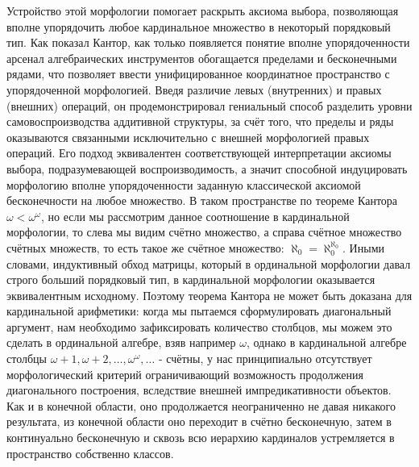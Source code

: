 \documentclass[12pt]{article}
\begin{document}
Устройство этой морфологии помогает раскрыть аксиома выбора, позволяющая вполне упорядочить любое кардинальное множество в некоторый порядковый тип. Как показал Кантор, как только появляется понятие вполне упорядоченности арсенал алгебраических инструментов обогащается пределами и бесконечными рядами, что позволяет ввести унифицированное координатное пространство с упорядоченной морфологией. Введя различие левых (внутренних) и правых (внешних) операций, он продемонстрировал гениальный способ разделить уровни самовоспроизводства аддитивной структуры, за счёт того, что пределы и ряды оказываются связанными исключительно с внешней морфологией правых операций. Его подход эквивалентен соответствующей интерпретации аксиомы выбора, подразумевающей воспроизводимость, а значит способной индуцировать морфологию вполне упорядоченности заданную классической аксиомой бесконечности на любое множество. В таком пространстве по теореме Кантора $\omega < \omega^{\omega}$, но если мы рассмотрим данное соотношение в кардинальной морфологии, то слева мы видим счётно множество, а справа счётное множество счётных множеств, то есть такое же счётное множество: $\aleph_0 = \aleph_0^{\aleph_0}$. Иными словами, индуктивный обход матрицы, который в ординальной морфологии давал строго больший порядковый тип, в кардинальной морфологии оказывается эквивалентным исходному. Поэтому теорема Кантора не может быть доказана для кардинальной арифметики: когда мы пытаемся сформулировать диагональный аргумент, нам необходимо зафиксировать количество столбцов, мы можем это сделать в ординальной алгебре, взяв например $\omega$, однако в кардинальной алгебре столбцы $\omega + 1, \omega + 2, \dots, \omega^{\omega}, \dots$ - счётны, у нас принципиально отсутствует морфологический критерий ограничивающий возможность продолжения диагонального построения, вследствие внешней импредикативности объектов. Как и в конечной области, оно продолжается неограниченно не давая никакого результата, из конечной области оно переходит в счётно бесконечную, затем в континуально бесконечную и сквозь всю иерархию кардиналов устремляется в пространство собственно классов. 
\end{document}
